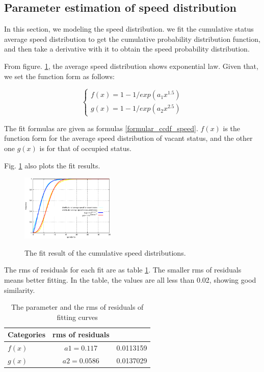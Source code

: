 \subsection{Parameter estimation of speed distribution}
\label{section_speed_modeling}
In this section, we modeling the speed distribution. we fit the cumulative status average speed distribution to get the cumulative probability distribution function, and then take a derivative with it to obtain the speed probability distribution.

From figure. \ref{figure_fit_ccdf_speed}, the average speed distribution shows exponential law. Given that, we set the function form as follows:

\begin{equation}\label{formular_ccdf_speed}
\left\{
\begin{array}{ll}
f(x) = 1-1/exp(a_1x^{1.5})\\
g(x) = 1-1/exp(a_2x^{2.5})
\end{array}
\right.
\end{equation}

The fit formulas are given as formulas \ref{formular_ccdf_speed}. $f(x)$ is the function form for the average speed distribution of vacant status, and the other one $g(x)$ is for that of occupied status.



Fig. \ref{figure_fit_ccdf_speed} also plots the fit results. 

\begin{figure}
\centering
\includegraphics[width=0.4\textwidth]{figures_201103/fit/speedfit.eps}\\
\centering
\caption{The fit result of the cumulative speed distributions.}\label{figure_fit_ccdf_speed}
\end{figure}

The rms of residuals for each fit are as table \ref{table_rms}. The smaller rms of residuals means better fitting.
In the table, the values are all less than 0.02, showing good similarity.

\begin{table}
\caption{The parameter and the rms of residuals of fitting curves}\label{table_rms}
\centering
\begin{tabular}{l|c|c}
  \hline
  Categories & rms of residuals  \\
  \hline
  $f(x)$ &$a1=0.117$ &0.0113159\\
  $g(x)$ &$a2=0.0586$ &0.0137029\\
  \hline
\end{tabular}
\end{table}

